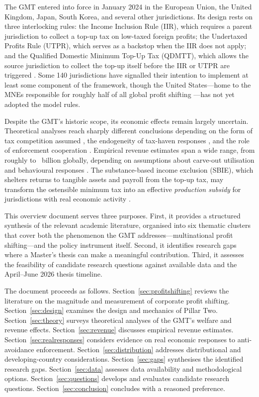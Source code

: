 \documentclass[12pt,a4paper]{article}
\begin{document}
The GMT entered into force in January 2024 in the European Union, the United Kingdom, Japan, South Korea, and several other jurisdictions.
Its design rests on three interlocking rules: the Income Inclusion Rule (IIR), which requires a parent jurisdiction to collect a top-up tax on low-taxed foreign profits; the Undertaxed Profits Rule (UTPR), which serves as a backstop when the IIR does not apply; and the Qualified Domestic Minimum Top-Up Tax (QDMTT), which allows the source jurisdiction to collect the top-up itself before the IIR or UTPR are triggered \parencite{bilicka2023}.
Some 140 jurisdictions have signalled their intention to implement at least some component of the framework, though the United States---home to the MNEs responsible for roughly half of all global profit shifting \parencite{torslov2022}---has not yet adopted the model rules.

Despite the GMT's historic scope, its economic effects remain largely uncertain.
Theoretical analyses reach sharply different conclusions depending on the form of tax competition assumed \parencite{janeba2023}, the endogeneity of tax-haven responses \parencite{Johannesen2022}, and the role of enforcement cooperation \parencite{hindriks2025}.
Empirical revenue estimates span a wide range, from roughly  to ~billion globally, depending on assumptions about carve-out utilisation and behavioural responses \parencite{barake2022}.
The substance-based income exclusion (SBIE), which shelters returns to tangible assets and payroll from the top-up tax, may transform the ostensible minimum tax into an effective \emph{production subsidy} for jurisdictions with real economic activity \parencite{schjelderup2024}.

This overview document serves three purposes.
First, it provides a structured synthesis of the relevant academic literature, organised into six thematic clusters that cover both the phenomenon the GMT addresses---multinational profit shifting---and the policy instrument itself.
Second, it identifies research gaps where a Master's thesis can make a meaningful contribution.
Third, it assesses the feasibility of candidate research questions against available data and the April--June 2026 thesis timeline.

The document proceeds as follows.
Section~\ref{sec:profitshifting} reviews the literature on the magnitude and measurement of corporate profit shifting.
Section~\ref{sec:design} examines the design and mechanics of Pillar Two.
Section~\ref{sec:theory} surveys theoretical analyses of the GMT's welfare and revenue effects.
Section~\ref{sec:revenue} discusses empirical revenue estimates.
Section~\ref{sec:realresponses} considers evidence on real economic responses to anti-avoidance enforcement.
Section~\ref{sec:distribution} addresses distributional and developing-country considerations.
Section~\ref{sec:gaps} synthesises the identified research gaps.
Section~\ref{sec:data} assesses data availability and methodological options.
Section~\ref{sec:questions} develops and evaluates candidate research questions.
Section~\ref{sec:conclusion} concludes with a reasoned preference.
\end{document}
